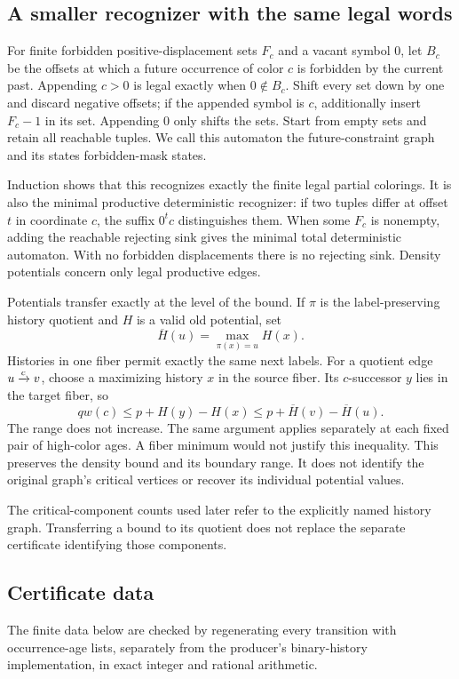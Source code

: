 \documentclass[11pt,reqno]{amsart}
\theoremstyle{plain}
\theoremstyle{plain}
\theoremstyle{plain}
\begin{document}
\subsection{A smaller recognizer with the same legal words}\label{M-sec:future-model}
For finite forbidden positive-displacement sets $F_c$ and a vacant
symbol $0$, let $B_c$ be the offsets at which a future occurrence of
color $c$ is forbidden by the current past. Appending $c>0$ is legal
exactly when $0\notin B_c$. Shift every set down by one and discard
negative offsets; if the appended symbol is $c$, additionally insert
$F_c-1$ in its set. Appending $0$ only shifts the sets. Start from
empty sets and retain all reachable tuples. We call this automaton the
future-constraint graph and its states forbidden-mask states.

Induction shows that this recognizes exactly the finite legal partial
colorings. It is also the minimal productive deterministic recognizer:
if two tuples differ at offset $t$ in coordinate $c$, the suffix
$0^tc$ distinguishes them. When some $F_c$ is nonempty, adding the
reachable rejecting sink gives the minimal total deterministic automaton.
With no forbidden displacements there is no rejecting sink. Density
potentials concern only legal productive edges.

Potentials transfer exactly at the level of the bound. If $\pi$ is the
label-preserving history quotient and $H$ is a valid old potential, set
\[
 \overline H(u)=\max_{\pi(x)=u}H(x).
\]
Histories in one fiber permit exactly the same next labels. For a quotient edge $u\mathrel{\smash{\xrightarrow{c}}}v$, choose
a maximizing history $x$ in the source fiber. Its $c$-successor $y$
lies in the target fiber, so
\[
 qw(c)\le p+H(y)-H(x)\le p+\overline H(v)-\overline H(u).
\]
The range does not increase. The same argument applies separately at
each fixed pair of high-color ages. A fiber minimum would not justify
this inequality. This preserves the density bound and its boundary range. It does not
identify the original graph's critical vertices or recover its individual
potential values.


The critical-component counts used later refer to the explicitly named
history graph. Transferring a bound to its quotient does not replace the
separate certificate identifying those components.

\subsection{Certificate data}
The finite data below are checked by regenerating every transition with occurrence-age lists,
separately from the producer's binary-history implementation, in exact integer and rational
arithmetic.
\end{document}
